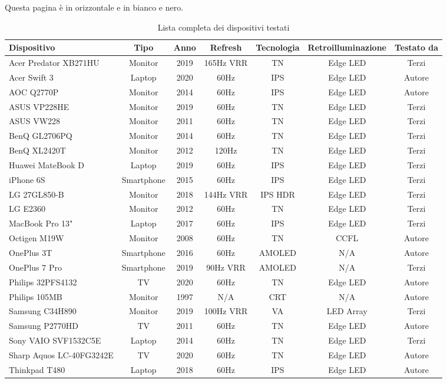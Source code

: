 \documentclass[12pt]{report}
\begin{document}
	\begin{landscape}
		\centering Questa pagina è in orizzontale e in bianco e nero.
		
		\begin{table}[H]
			\centering
			\begin{tabular}{|l|c|c|c|c|c|c|} 
				\hline
				\textbf{Dispositivo} & \textbf{Tipo} & \textbf{Anno} & \textbf{Refresh} & \textbf{Tecnologia} & \textbf{Retroilluminazione} & \textbf{Testato da}  \\ 
				\hline
				Acer Predator XB271HU & Monitor & 2019 & 165Hz VRR & TN  & Edge LED & Terzi \\ \hline
				Acer Swift 3 & Laptop & 2020 & 60Hz & IPS & Edge LED & Autore \\ \hline
				AOC Q2770P & Monitor & 2014 & 60Hz & IPS & Edge LED & Autore \\ \hline
				ASUS VP228HE & Monitor & 2019 & 60Hz & TN & Edge LED & Terzi \\ \hline
				ASUS VW228 & Monitor & 2011 & 60Hz & TN & Edge LED & Terzi \\ \hline
				BenQ GL2706PQ & Monitor & 2014 & 60Hz & TN & Edge LED & Terzi \\ \hline
				BenQ XL2420T & Monitor & 2012 & 120Hz & TN & Edge LED & Terzi \\ \hline
				Huawei MateBook D & Laptop & 2019 & 60Hz & IPS & Edge LED & Terzi \\ \hline
				iPhone 6S & Smartphone & 2015 & 60Hz & IPS & Edge LED & Terzi \\ \hline
				LG 27GL850-B & Monitor & 2018 & 144Hz VRR & IPS HDR & Edge LED & Terzi \\ \hline
				LG E2360 & Monitor & 2012 & 60Hz & TN & Edge LED & Terzi \\ \hline
				MacBook Pro 13" & Laptop & 2017 & 60Hz & IPS & Edge LED & Terzi \\ \hline
				Octigen M19W & Monitor & 2008 & 60Hz & TN & CCFL & Autore \\ \hline
				OnePlus 3T & Smartphone & 2016 & 60Hz & AMOLED & N/A & Autore \\ \hline
				OnePlus 7 Pro & Smartphone & 2019 & 90Hz VRR & AMOLED & N/A & Terzi \\ \hline
				Philips 32PFS4132 & TV & 2020 & 60Hz & TN & Edge LED & Autore \\ \hline
				Philips 105MB & Monitor & 1997 & N/A & CRT & N/A & Autore \\ \hline
				Samsung C34H890 & Monitor & 2019 & 100Hz VRR & VA & LED Array & Terzi \\ \hline
				Samsung P2770HD & TV & 2011 & 60Hz & TN & Edge LED & Autore \\ \hline
				Sony VAIO SVF1532C5E & Laptop & 2014 & 60Hz & TN & Edge LED & Terzi \\ \hline
				Sharp Aquos LC-40FG3242E & TV & 2020 & 60Hz & TN & Edge LED & Autore \\ \hline
				Thinkpad T480 & Laptop & 2018 & 60Hz & IPS & Edge LED & Autore \\ \hline
			\end{tabular}
			\caption{\label{tab:display_list}Lista completa dei dispositivi testati}
		\end{table}
	\end{landscape}
\end{document}

